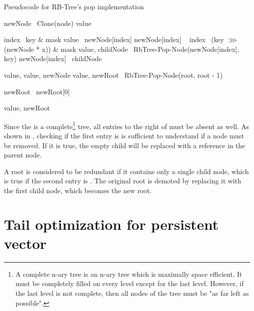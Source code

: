 \begin{listing}[ht!]
    \caption{Pseudocode for RB-Tree's pop implementation}
    \label{lst:rb-tree-pop}

    \begin{algorithmic}
            \State newNode \la\ Clone(node)
            \State value \la\ \nil{}

                \State index \la\ key \& mask
                \State value \la\ newNode[index]
                \State newNode[index] \la\ \nil{}
            \Else
                \State index \la\ (key $\ggg$ (newNode * x)) \& mask
                \State value, childNode \la\ RbTree-Pop-Node(newNode[index], key)
                \State newNode[index] \la\ childNode
            \EndIf

                \State \Return value, \nil{}
            \Else
                \State \Return value, newNode
            \EndIf
        \EndFunction
        \State
            \State value, newRoot \la\ RbTree-Pop-Node(root, root - 1)

                \State newRoot \la\ newRoot[0]
            \EndIf

            \State \Return value, newRoot
        \EndFunction
    \end{algorithmic}
\end{listing}

Since the \rbtree{} is a complete\footnote{A complete n-ary tree is an n-ary tree which is maximally space efficient. It must be completely filled on every level except for the last level. However, if the last level is not complete, then all nodes of the tree must be "as far left as possible".} tree, all entries to the right of \nil{} must be absent as well. As shown in , checking if the first entry is \nil{} is sufficient to understand if a node must be removed. If it is true, the empty child will be replaced with a \nil{} reference in the parent node.

A root is considered to be redundant if it contains only a single child node, which is true if the second entry is \nil{}.  The original root is demoted by replacing it with the first child node, which becomes the new root.

\section{Tail optimization for persistent vector}


